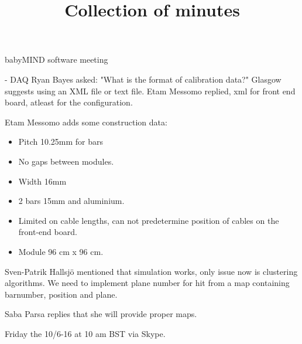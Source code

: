 \documentclass{article}
\title{Collection of minutes}
\author{\LaTeXe}
\begin{document}
\begin{Minutes}{babyMIND software meeting}

\maketitle

- DAQ
Ryan Bayes asked: "What is the format of calibration data?" Glasgow suggests using an XML file or text file.
Etam Messomo replied, xml for front end board, atleast for the configuration.

Etam Messomo adds some construction data:
\begin{itemize}
\item Pitch 10.25mm for bars
\item No gaps between modules.
\item Width 16mm
\item 2 bars 15mm and aluminium.
\item Limited on cable lengths, can not predetermine position of cables on the front-end board. 
\item Module 96 cm x 96 cm.
\end{itemize}

Sven-Patrik Hallsj\"o mentioned that simulation works, only issue now is clustering algorithms. We need to implement plane number for hit from a map containing barnumber, position and plane.

Saba Parsa replies that she will provide proper maps.

Friday the 10/6-16 at 10 am BST via Skype.

\end{Minutes}
\end{document}
